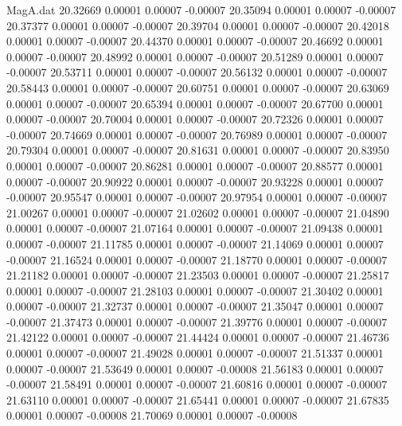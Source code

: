 \begin{filecontents}{MagA.dat}
  20.32669    0.00001    0.00007   -0.00007
  20.35094    0.00001    0.00007   -0.00007
  20.37377    0.00001    0.00007   -0.00007
  20.39704    0.00001    0.00007   -0.00007
  20.42018    0.00001    0.00007   -0.00007
  20.44370    0.00001    0.00007   -0.00007
  20.46692    0.00001    0.00007   -0.00007
  20.48992    0.00001    0.00007   -0.00007
  20.51289    0.00001    0.00007   -0.00007
  20.53711    0.00001    0.00007   -0.00007
  20.56132    0.00001    0.00007   -0.00007
  20.58443    0.00001    0.00007   -0.00007
  20.60751    0.00001    0.00007   -0.00007
  20.63069    0.00001    0.00007   -0.00007
  20.65394    0.00001    0.00007   -0.00007
  20.67700    0.00001    0.00007   -0.00007
  20.70004    0.00001    0.00007   -0.00007
  20.72326    0.00001    0.00007   -0.00007
  20.74669    0.00001    0.00007   -0.00007
  20.76989    0.00001    0.00007   -0.00007
  20.79304    0.00001    0.00007   -0.00007
  20.81631    0.00001    0.00007   -0.00007
  20.83950    0.00001    0.00007   -0.00007
  20.86281    0.00001    0.00007   -0.00007
  20.88577    0.00001    0.00007   -0.00007
  20.90922    0.00001    0.00007   -0.00007
  20.93228    0.00001    0.00007   -0.00007
  20.95547    0.00001    0.00007   -0.00007
  20.97954    0.00001    0.00007   -0.00007
  21.00267    0.00001    0.00007   -0.00007
  21.02602    0.00001    0.00007   -0.00007
  21.04890    0.00001    0.00007   -0.00007
  21.07164    0.00001    0.00007   -0.00007
  21.09438    0.00001    0.00007   -0.00007
  21.11785    0.00001    0.00007   -0.00007
  21.14069    0.00001    0.00007   -0.00007
  21.16524    0.00001    0.00007   -0.00007
  21.18770    0.00001    0.00007   -0.00007
  21.21182    0.00001    0.00007   -0.00007
  21.23503    0.00001    0.00007   -0.00007
  21.25817    0.00001    0.00007   -0.00007
  21.28103    0.00001    0.00007   -0.00007
  21.30402    0.00001    0.00007   -0.00007
  21.32737    0.00001    0.00007   -0.00007
  21.35047    0.00001    0.00007   -0.00007
  21.37473    0.00001    0.00007   -0.00007
  21.39776    0.00001    0.00007   -0.00007
  21.42122    0.00001    0.00007   -0.00007
  21.44424    0.00001    0.00007   -0.00007
  21.46736    0.00001    0.00007   -0.00007
  21.49028    0.00001    0.00007   -0.00007
  21.51337    0.00001    0.00007   -0.00007
  21.53649    0.00001    0.00007   -0.00008
  21.56183    0.00001    0.00007   -0.00007
  21.58491    0.00001    0.00007   -0.00007
  21.60816    0.00001    0.00007   -0.00007
  21.63110    0.00001    0.00007   -0.00007
  21.65441    0.00001    0.00007   -0.00007
  21.67835    0.00001    0.00007   -0.00008
  21.70069    0.00001    0.00007   -0.00008

\end{filecontents}
